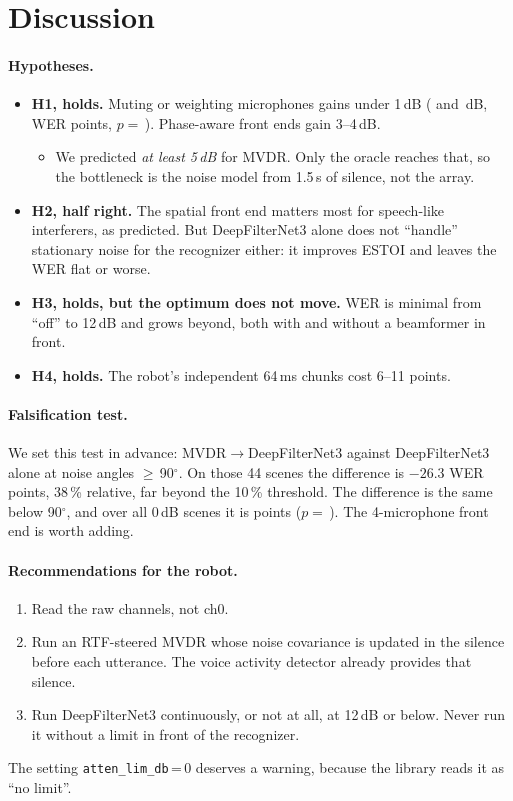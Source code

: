 \section{Discussion}
\label{sec:discussion}

\paragraph{Hypotheses.}
\begin{itemize}
\item \textbf{H1, holds.} Muting or weighting microphones gains under
  1\,dB (\Gainmute{} and \Gainmutesoft\,dB, WER \DiffMuteVsRef{} points,
  $p=$\,\PMuteVsRef). Phase-aware front ends gain 3--4\,dB.
  \begin{itemize}
  \item We predicted \emph{at least 5\,dB} for MVDR. Only the oracle
    reaches that, so the bottleneck is the noise model from 1.5\,s of
    silence, not the array.
  \end{itemize}
\item \textbf{H2, half right.} The spatial front end matters most for
  speech-like interferers, as predicted. But DeepFilterNet3 alone does not
  ``handle'' stationary noise for the recognizer either: it improves ESTOI
  and leaves the WER flat or worse.
\item \textbf{H3, holds, but the optimum does not move.} WER is minimal
  from ``off'' to 12\,dB and grows beyond, both with and without a
  beamformer in front.
\item \textbf{H4, holds.} The robot's independent 64\,ms chunks cost 6--11
  points.
\end{itemize}

\paragraph{Falsification test.} We set this test in advance:
MVDR$\to$DeepFilterNet3 against DeepFilterNet3 alone at noise angles
$\geq$\,90$^\circ$. On those 44 scenes the difference is $-26.3$ WER
points, 38\,\% relative, far beyond the 10\,\% threshold. The difference is
the same below 90$^\circ$, and over all 0\,dB scenes it is
\DiffRtfDfnVsRefDfn{} points ($p=$\,\PRtfDfnVsRefDfn). The 4-microphone front end is worth adding.

\paragraph{Recommendations for the robot.}
\begin{enumerate}
\item Read the raw channels, not ch0.
\item Run an RTF-steered MVDR whose noise covariance is updated in the
  silence before each utterance. The voice activity detector already
  provides that silence.
\item Run DeepFilterNet3 continuously, or not at all, at 12\,dB or below.
  Never run it without a limit in front of the recognizer.
\end{enumerate}
The setting \texttt{atten\_lim\_db}\,=\,0 deserves a warning, because the
library reads it as ``no limit''.

